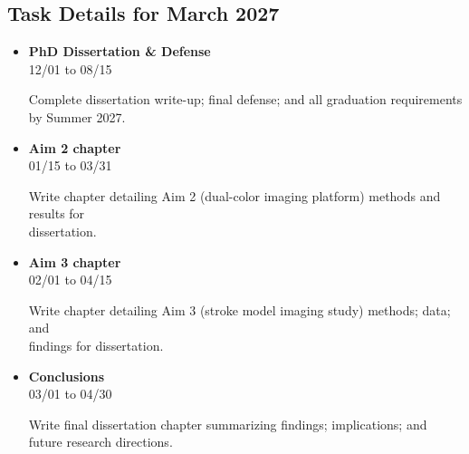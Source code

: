 \documentclass[landscape,a4paper]{article}
\begin{document}
\vspace{0.5cm}
\subsection{Task Details for March 2027}
\begin{itemize}[leftmargin=1cm, itemsep=0.8em]
    \item \textcolor{other}{\textbf{PhD Dissertation \& Defense}}\\[0.2em]
          \textcolor{black!70}{\small 12/01 to 08/15}
\\[0.3em]
          \begin{minipage}[t]{0.85\textwidth}
          \textcolor{black!80}{Complete dissertation write-up; final defense; and all graduation requirements by Summer 2027.}
          \end{minipage}

    \item \textcolor{other}{\textbf{Aim 2 chapter}}\\[0.2em]
          \textcolor{black!70}{\small 01/15 to 03/31}
\\[0.3em]
          \begin{minipage}[t]{0.85\textwidth}
          \textcolor{black!80}{Write chapter detailing Aim 2 (dual-color imaging platform) methods and results for\\[0.1em]
          dissertation.}
          \end{minipage}

    \item \textcolor{other}{\textbf{Aim 3 chapter}}\\[0.2em]
          \textcolor{black!70}{\small 02/01 to 04/15}
\\[0.3em]
          \begin{minipage}[t]{0.85\textwidth}
          \textcolor{black!80}{Write chapter detailing Aim 3 (stroke model imaging study) methods; data; and\\[0.1em]
          findings for dissertation.}
          \end{minipage}

    \item \textcolor{other}{\textbf{Conclusions}}\\[0.2em]
          \textcolor{black!70}{\small 03/01 to 04/30}
\\[0.3em]
          \begin{minipage}[t]{0.85\textwidth}
          \textcolor{black!80}{Write final dissertation chapter summarizing findings; implications; and future research directions.}
          \end{minipage}

\end{itemize}
\end{document}
